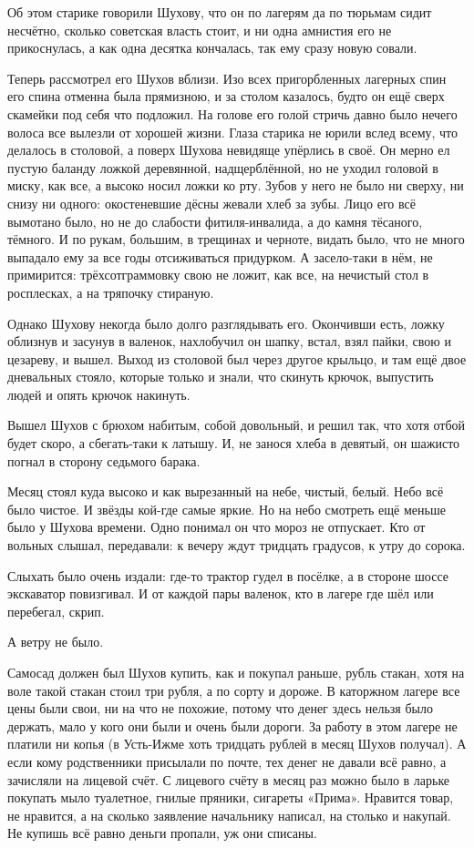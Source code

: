 Об этом старике говорили Шухову, что он по лагерям да по тюрьмам сидит несчётно, сколько
советская власть стоит, и ни одна амнистия его не прикоснулась, а как одна десятка кончалась,
так ему сразу новую совали.

Теперь рассмотрел его Шухов вблизи. Изо всех пригорбленных лагерных спин его спина отменна
была прямизною, и за столом казалось, будто он ещё сверх скамейки под себя что подложил. На
голове его голой стричь давно было нечего \dash волоса все вылезли от хорошей жизни. Глаза
старика не юрили вслед всему, что делалось в столовой, а поверх Шухова невидяще упёрлись в
своё. Он мерно ел пустую баланду ложкой деревянной, надщерблённой, но не уходил головой в
миску, как все, а высоко носил ложки ко рту. Зубов у него не было ни сверху, ни снизу ни одного:
окостеневшие дёсны жевали хлеб за зубы. Лицо его всё вымотано было, но не до слабости
фитиля-инвалида, а до камня тёсаного, тёмного. И по рукам, большим, в трещинах и черноте,
видать было, что не много выпадало ему за все годы отсиживаться придурком. А засело-таки в
нём, не примирится: трёхсотграммовку свою не ложит, как все, на нечистый стол в росплесках, а
\dash на тряпочку стираную.

Однако Шухову некогда было долго разглядывать его. Окончивши есть, ложку облизнув и засунув
в валенок, нахлобучил он шапку, встал, взял пайки, свою и цезареву, и вышел. Выход из столовой
был через другое крыльцо, и там ещё двое дневальных стояло, которые только и знали, что
скинуть крючок, выпустить людей и опять крючок накинуть.

Вышел Шухов с брюхом набитым, собой довольный, и решил так, что хотя отбой будет скоро, а
сбегать-таки к латышу. И, не занося хлеба в девятый, он шажисто погнал в сторону седьмого
барака.

Месяц стоял куда высоко и как вырезанный на небе, чистый, белый. Небо всё было чистое. И
звёзды кой-где \dash самые яркие. Но на небо смотреть ещё меньше было у Шухова времени. Одно
понимал он \dash что мороз не отпускает. Кто от вольных слышал, передавали: к вечеру ждут
тридцать градусов, к утру \dash до сорока.

Слыхать было очень издали: где-то трактор гудел в посёлке, а в стороне шоссе экскаватор
повизгивал. И от каждой пары валенок, кто в лагере где шёл или перебегал, \dash скрип.

А ветру не было.

Самосад должен был Шухов купить, как и покупал раньше, \dash рубль стакан, хотя на воле такой
стакан стоил три рубля, а по сорту и дороже. В каторжном лагере все цены были свои, ни на что
не похожие, потому что денег здесь нельзя было держать, мало у кого они были и очень были
дороги. За работу в этом лагере не платили ни копья (в Усть-Ижме хоть тридцать рублей в месяц
Шухов получал). А если кому родственники присылали по почте, тех денег не давали всё равно, а
зачисляли на лицевой счёт. С лицевого счёту в месяц раз можно было в ларьке покупать мыло
туалетное, гнилые пряники, сигареты «Прима». Нравится товар, не нравится, \dash а на сколько
заявление начальнику написал, на столько и накупай. Не купишь \dash всё равно деньги пропали, уж
они списаны.

